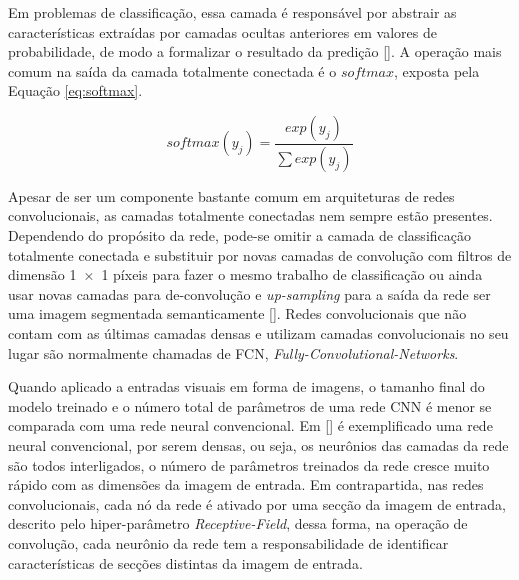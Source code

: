 \begin{enumerate}
            Em problemas de classificação, essa camada é responsável por abstrair as características extraídas por camadas ocultas anteriores em 
            valores de probabilidade, de modo a formalizar o resultado da predição []. A operação mais comum na saída 
            da camada totalmente conectada é o $softmax$, exposta pela Equação \ref{eq:softmax}.
            
            \begin{equation}
                \label{eq:softmax}
                softmax(y_j) = \frac{exp(y_j)}{\sum exp(y_j)}
            \end{equation}
            
            Apesar de ser um componente bastante comum em arquiteturas de redes convolucionais, as camadas totalmente conectadas nem sempre estão 
            presentes. Dependendo do propósito da rede, pode-se omitir a camada de classificação totalmente conectada e substituir por novas camadas 
            de convolução com filtros de dimensão 1 × 1 píxeis para fazer o mesmo trabalho de classificação ou ainda usar novas camadas para 
            de-convolução e \textit{up-sampling} para a saída da rede ser uma imagem segmentada semanticamente []. Redes convolucionais 
            que não contam com as últimas camadas densas e utilizam camadas convolucionais no seu lugar são normalmente chamadas de FCN, \textit{Fully-Convolutional-Networks}.
\end{enumerate}

Quando aplicado a entradas visuais em forma de imagens, o tamanho final do modelo treinado e o número total de parâmetros de uma rede CNN é menor se 
comparada com uma rede neural convencional. Em [] é exemplificado uma rede neural convencional, por serem densas, ou seja, os 
neurônios das camadas da rede são todos interligados, o número de parâmetros treinados da rede cresce muito rápido com as dimensões da imagem de entrada. 
Em contrapartida, nas redes convolucionais, cada nó da rede é ativado por uma secção da imagem de entrada, descrito pelo hiper-parâmetro \textit{Receptive-Field}, 
dessa forma, na operação de convolução, cada neurônio da rede tem a responsabilidade de identificar características de secções distintas da imagem de entrada.


